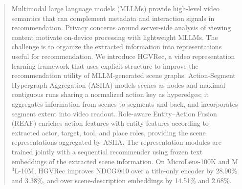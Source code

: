 \begin{abstract}
Multimodal large language models (MLLMs) provide high-level video semantics that can complement metadata and interaction signals in recommendation.
Privacy concerns around server-side analysis of viewing content motivate on-device processing with lightweight MLLMs.
The challenge is to organize the extracted information into representations useful for recommendation.
We introduce HGVRec, a video representation learning framework that uses explicit structure to improve the recommendation utility of MLLM-generated scene graphs.
Action-Segment Hypergraph Aggregation (ASHA) models scenes as nodes and maximal contiguous runs sharing a normalized action key as hyperedges; it aggregates information from scenes to segments and back, and incorporates segment extent into video readout.
Role-aware Entity--Action Fusion (REAF) enriches action features with entity features according to extracted actor, target, tool, and place roles, providing the scene representations aggregated by ASHA.
The representation modules are trained jointly with a sequential recommender using frozen text embeddings of the extracted scene information.
On MicroLens-100K and M$^3$L-10M, HGVRec improves NDCG@10 over a title-only encoder by 28.90\% and 3.38\%, and over scene-description embeddings by 14.51\% and 2.68\%.
\end{abstract}
